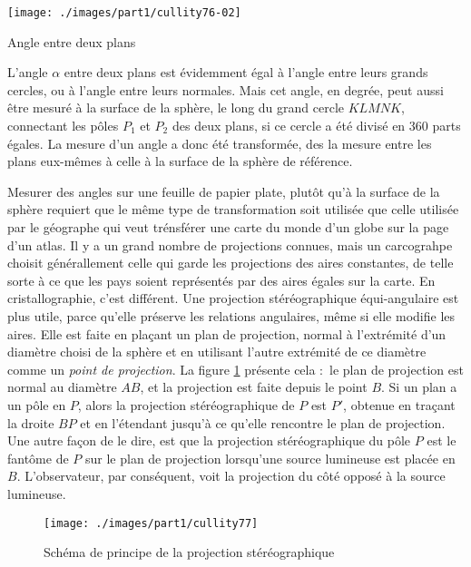 \begin{marginfigure}
    \texttt{[image: ./images/part1/cullity76-02]}
    \caption{Angle entre deux plans}
    \label{fig:stereoangles}
\end{marginfigure}

L'angle $\alpha$ entre deux plans est évidemment égal à l'angle entre leurs grands cercles, ou à l'angle entre leurs normales. Mais cet angle, en degrée, peut aussi être mesuré à la surface de la sphère, le long du grand cercle $KLMNK$, connectant les pôles $P_1$ et $P_2$ des deux plans, si ce cercle a été divisé en 360 parts égales. La mesure d'un angle a donc été transformée, des la mesure entre les plans eux-mêmes à celle à la surface de la sphère de référence.

Mesurer des angles sur une feuille de papier plate, plutôt qu'à la surface de la sphère requiert que le même type de transformation soit utilisée que celle utilisée par le géographe qui veut trénsférer une carte du monde d'un globe sur la page d'un atlas. Il y a un grand nombre de projections connues, mais un carcograhpe choisit générallement celle qui garde les projections des aires constantes, de telle sorte à ce que les pays soient représentés par des aires égales sur la carte. En cristallographie, c'est différent. Une projection stéréographique équi-angulaire est plus utile, parce qu'elle préserve les relations angulaires, même si elle modifie les aires. Elle est faite en plaçant un plan de projection, normal à l'extrémité d'un diamètre choisi de la sphère et en utilisant l'autre extrémité de ce diamètre comme un \emph{point de projection}. La figure \ref{fig:stereoprojection} présente cela : le plan de projection est normal au diamètre $AB$, et la projection est faite depuis le point $B$. Si un plan a un pôle en $P$, alors la projection stéréographique de $P$ est $P'$, obtenue en traçant la droite $BP$ et en l'étendant jusqu'à ce qu'elle rencontre le plan de projection. Une autre façon de le dire, est que la projection stéréographique du pôle $P  $ est le fantôme de $P$ sur le plan de projection lorsqu'une source lumineuse est placée en $B$. L'observateur, par conséquent, voit la projection du côté opposé à la source lumineuse.

\begin{figure}
    \texttt{[image: ./images/part1/cullity77]}
    \caption{Schéma de principe de la projection stéréographique}
    \label{fig:stereoprojection}
\end{figure}

